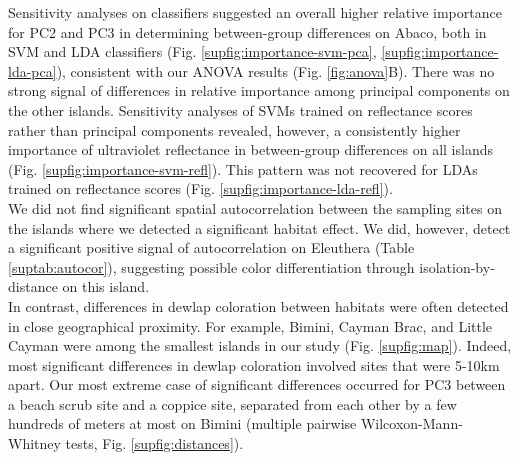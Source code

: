 Sensitivity analyses on classifiers suggested an overall higher relative importance for PC2 and PC3 in determining between-group differences on Abaco, both in SVM and LDA classifiers (Fig. \ref{supfig:importance-svm-pca}, \ref{supfig:importance-lda-pca}), consistent with our ANOVA results (Fig. \ref{fig:anova}B). There was no strong signal of differences in relative importance among principal components on the other islands. Sensitivity analyses of SVMs trained on reflectance scores rather than principal components revealed, however, a consistently higher importance of ultraviolet reflectance in between-group differences on all islands (Fig. \ref{supfig:importance-svm-refl}). This pattern was not recovered for LDAs trained on reflectance scores (Fig. \ref{supfig:importance-lda-refl}).\\


We did not find significant spatial autocorrelation between the sampling sites on the islands where we detected a significant habitat effect. We did, however, detect a significant positive signal of autocorrelation on Eleuthera (Table \ref{suptab:autocor}), suggesting possible color differentiation through isolation-by-distance on this island.\\

In contrast, differences in dewlap coloration between habitats were often detected in close geographical proximity. For example, Bimini, Cayman Brac, and Little Cayman were among the smallest islands in our study (Fig. \ref{supfig:map}). Indeed, most significant differences in dewlap coloration involved sites that were 5-10km apart. Our most extreme case of significant differences occurred for PC3 between a beach scrub site and a coppice site, separated from each other by a few hundreds of meters at most on Bimini (multiple pairwise Wilcoxon-Mann-Whitney tests, Fig. \ref{supfig:distances}).\\


